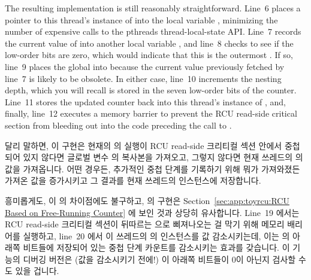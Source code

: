 The resulting  implementation is still reasonably
straightforward.
Line~6 places a pointer to this thread's instance of 
into the local variable , minimizing the number of expensive
calls to the pthreads thread-local-state API.
Line~7 records the current value of  into another
local variable , and line~8 checks to see if the low-order
bits are zero, which would indicate that this is the outermost
.
If so, line~9 places the global  into  because
the current value previously fetched by line~7 is likely to be obsolete.
In either case, line~10 increments the nesting depth, which you will
recall is stored in the seven low-order bits of the counter.
Line~11 stores the updated counter back into this thread's instance
of , and, finally, line~12 executes a memory
barrier to prevent the RCU read-side critical section from bleeding out
into the code preceding the call to .
\fi

달리 말하면, 이  구현은 현재의  의
실행이 RCU read-side 크리티컬 섹션 안에서 중첩되어 있지 않다면 글로벌 변수
 의 복사본을 가져오고, 그렇지 않다면 현재 쓰레드의
 의 값을 가져옵니다.
어떤 경우든, 추가적인 중첩 단계를 기록하기 위해 뭐가 가져와졌든 가져온 값을
증가시키고 그 결과를 현재 쓰레드의  인스턴스에 저장합니다.
\iffalse

In other words, this implementation of \co{rcu_read_lock()} picks up a copy
of the global \co{rcu_gp_ctr} unless the current invocation of
\co{rcu_read_lock()} is nested within an RCU read-side critical section,
in which case it instead fetches the contents of the current thread's
instance of \co{rcu_reader_gp}.
Either way, it increments whatever value it fetched in order to record
an additional nesting level, and stores the result in the current
thread's instance of \co{rcu_reader_gp}.
\fi

흥미롭게도, 이  의 차이점에도 불구하고,
 의 구현은
Section~\ref{sec:app:toyrcu:RCU Based on Free-Running Counter} 에 보인 것과 상당히
유사합니다.
Line~19 에서는 RCU read-side 크리티컬 섹션이 뒤따르는 
으로 삐져나오는 걸 막기 위해 메모리 배리어를 실행하고, line~20 에서 이 쓰레드의
 의 인스턴스를 값 감소시키는데, 이는  의
아래쪽 비트들에 저장되어 있는 중첩 단계 카운트를 감소시키는 효과를 갖습니다.
이 기능의 디버깅 버전은 (값을 감소시키기 전에!) 이 아래쪽 비트들이 0이 아닌지
검사할 수도 있을 겁니다.
\iffalse

